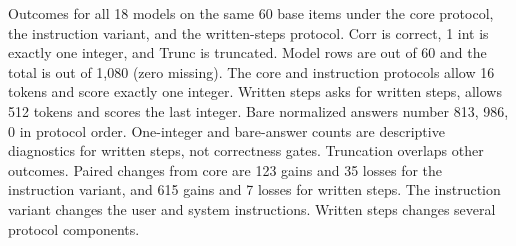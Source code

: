 \begin{table}[t]
\caption{Outcomes for all 18 models on the same 60 base items under the core protocol, the instruction variant, and the written-steps protocol. Corr is correct, 1 int is exactly one integer, and Trunc is truncated. Model rows are out of 60 and the total is out of 1,080 (zero missing). The core and instruction protocols allow 16 tokens and score exactly one integer. Written steps asks for written steps, allows 512 tokens and scores the last integer. Bare normalized answers number 813, 986, 0 in protocol order. One-integer and bare-answer counts are descriptive diagnostics for written steps, not correctness gates. Truncation overlaps other outcomes. Paired changes from core are 123 gains and 35 losses for the instruction variant, and 615 gains and 7 losses for written steps. The instruction variant changes the user and system instructions. Written steps changes several protocol components.}
\label{tab:protocol-by-model}
\end{table}
